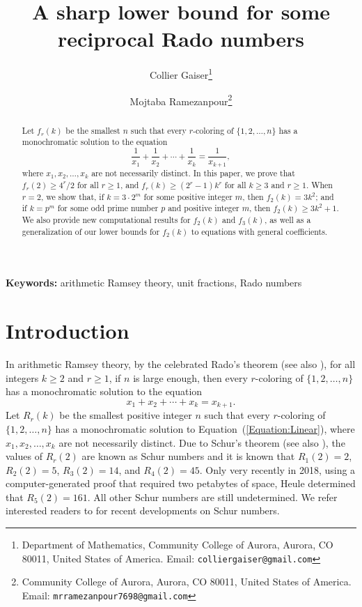 \documentclass[11pt]{article}
\title{A sharp lower bound for some reciprocal Rado numbers}
\author{Collier Gaiser\thanks{Department of Mathematics, Community College of Aurora, Aurora, CO 80011,  United States of America. Email: {\tt colliergaiser@gmail.com}}
\and 
Mojtaba Ramezanpour\thanks{Community College of Aurora, Aurora, CO 80011, United States of America. Email: {\tt mrramezanpour7698@gmail.com}}
}
\date{}
\theoremstyle{definition}
\begin{document}
\maketitle


\maketitle
\begin{abstract}
Let $f_r(k)$ be the smallest $n$ such that every $r$-coloring of $\{1,2,\ldots,n\}$ has a monochromatic solution to the equation
\[
\frac{1}{x_1}+\frac{1}{x_2}+\cdots+\frac{1}{x_k}=\frac{1}{x_{k+1}},
\]
where $x_1,x_2,\ldots,x_k$ are not necessarily distinct. In this paper, we prove that $f_r(2)\geq 4^r/2$ for all $r\geq1$, and $f_r(k)\geq(2^r-1)k^r$ for all $k\geq3$ and $r\geq1$. When $r=2$, we show that, if $k=3\cdot2^m$ for some positive integer $m$, then $f_2(k)=3k^2$; and if $k=p^m$ for some odd prime number $p$ and positive integer $m$, then $f_2(k)\geq3k^2+1$. We also provide new computational results for $f_2(k)$ and $f_3(k)$, as well as a generalization of our lower bounds for $f_2(k)$ to equations with general coefficients.


\end{abstract}

{\small \textbf{Keywords:} arithmetic Ramsey theory, unit fractions, Rado numbers} \\

\maketitle

\section{Introduction}
In arithmetic Ramsey theory, by the celebrated Rado's theorem \cite{Rado1933} (see also \cite[Chapter 9]{LandmanRobertson2014}), for all integers $k\geq2$ and $r\geq1$, if $n$ is large enough, then every $r$-coloring of $\{1,2,\ldots,n\}$ has a monochromatic solution to the equation
\begin{equation}\label{Equation:Linear}
x_1+x_2+\cdots+x_k=x_{k+1}.
\end{equation}
Let $R_r(k)$ be the smallest positive integer $n$ such that every $r$-coloring of $\{1,2,\ldots,n\}$ has a monochromatic solution to Equation~(\ref{Equation:Linear}), where $x_1,x_2,\ldots,x_k$ are not necessarily distinct. Due to Schur's theorem \cite{Schur1916} (see also \cite[Chapter 8]{LandmanRobertson2014}), the values of $R_r(2)$ are known as Schur numbers and it is known that $R_1(2)=2$, $R_2(2)=5$, $R_3(2)=14$, and $R_4(2)=45$. Only very recently in 2018, using a computer-generated proof that required two petabytes of space, Heule \cite{Heule2018} determined that $R_5(2)=161$. All other Schur numbers are still undetermined. We refer interested readers to \cite{ACPPRT2022} for recent developments on Schur numbers.
\end{document}
